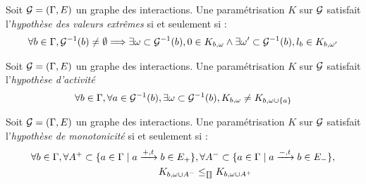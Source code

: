 \begin{critere}
  Soit $\mathcal{G} = (\mathrm{\Gamma}, E)$ un graphe des interactions.
  Une paramétrisation $K$ sur $\mathcal{G}$ satisfait l'\emph{hypothèse des valeurs extrêmes}
  si et seulement si :
  \begin{align*}
    \forall b \in \mathrm{\Gamma}, \mathcal{G}^{-1}(b) \neq \emptyset \Longrightarrow
    \exists \omega \subset \mathcal{G}^{-1}(b), 0 \in K_{b,\omega} \wedge
    \exists \omega' \subset \mathcal{G}^{-1}(b), l_b \in K_{b,\omega'}
  \end{align*}
\end{critere}

\begin{critere}
  Soit $\mathcal{G} = (\mathrm{\Gamma}, E)$ un graphe des interactions.
  Une paramétrisation $K$ sur $\mathcal{G}$ satisfait l'\emph{hypothèse d'activité}
  \begin{align*}
    \forall b \in \mathrm{\Gamma}, \forall a \in \mathcal{G}^{-1}(b), \exists \omega \subset \mathcal{G}^{-1}(b),
    K_{b,\omega} \neq K_{b,\omega \cup \{ a \}}
  \end{align*}
\end{critere}

\begin{critere}
  Soit $\mathcal{G} = (\mathrm{\Gamma}, E)$ un graphe des interactions.
  Une paramétrisation $K$ sur $\mathcal{G}$ satisfait l'\emph{hypothèse de monotonicité}
  si et seulement si :
  \begin{align*}
    \forall b \in \mathrm{\Gamma},
    \forall A^+ \subset \{ a \in \mathrm{\Gamma} \mid a \xrightarrow{+, t} b \in E_+ \}&,
    \forall A^- \subset \{ a \in \mathrm{\Gamma} \mid a \xrightarrow{-, t} b \in E_- \},\\
    K_{b,\omega \cup A^-} & \leq_{\llbracket\rrbracket} K_{b,\omega \cup A^+}
  \end{align*}
\end{critere}



